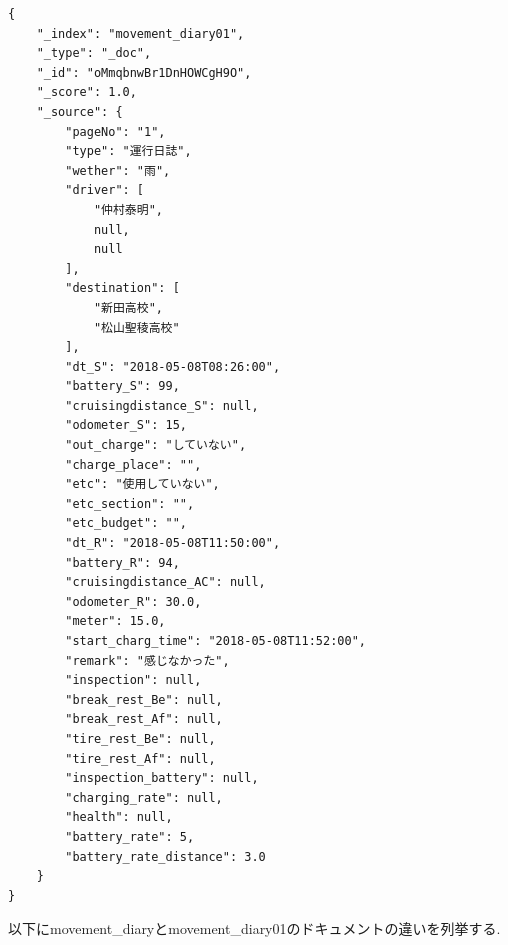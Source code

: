 \documentclass[a4j,12pt,]{jarticle}
\begin{document}
\begin{lstlisting}[caption=movement\_diary01のドキュメントデータ, label=sc1]
  {
    "_index": "movement_diary01",
    "_type": "_doc",
    "_id": "oMmqbnwBr1DnHOWCgH9O",
    "_score": 1.0,
    "_source": {
        "pageNo": "1",
        "type": "運行日誌",
        "wether": "雨",
        "driver": [
            "仲村泰明",
            null,
            null
        ],
        "destination": [
            "新田高校",
            "松山聖稜高校"
        ],
        "dt_S": "2018-05-08T08:26:00",
        "battery_S": 99,
        "cruisingdistance_S": null,
        "odometer_S": 15,
        "out_charge": "していない",
        "charge_place": "",
        "etc": "使用していない",
        "etc_section": "",
        "etc_budget": "",
        "dt_R": "2018-05-08T11:50:00",
        "battery_R": 94,
        "cruisingdistance_AC": null,
        "odometer_R": 30.0,
        "meter": 15.0,
        "start_charg_time": "2018-05-08T11:52:00",
        "remark": "感じなかった",
        "inspection": null,
        "break_rest_Be": null,
        "break_rest_Af": null,
        "tire_rest_Be": null,
        "tire_rest_Af": null,
        "inspection_battery": null,
        "charging_rate": null,
        "health": null,
        "battery_rate": 5,
        "battery_rate_distance": 3.0
    }
}
\end{lstlisting}

以下にmovement\_diaryとmovement\_diary01のドキュメントの違いを列挙する.
\end{document}
